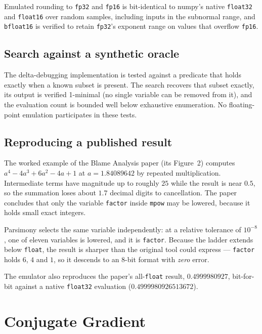 \documentclass[11pt]{article}
\begin{document}
Emulated rounding to \texttt{fp32} and \texttt{fp16} is bit-identical to numpy's
native \texttt{float32} and \texttt{float16} over random samples, including
inputs in the subnormal range, and \texttt{bfloat16} is verified to retain
\texttt{fp32}'s exponent range on values that overflow \texttt{fp16}.

\subsection{Search against a synthetic oracle}

The delta-debugging implementation is tested against a predicate that holds
exactly when a known subset is present. The search recovers that subset exactly,
its output is verified 1-minimal (no single variable can be removed from it),
and the evaluation count is bounded well below
exhaustive enumeration. No floating-point emulation participates in these tests.

\subsection{Reproducing a published result}
\label{sec:repro}

The worked example of the Blame Analysis paper (its Figure~2) computes
$a^4 - 4a^3 + 6a^2 - 4a + 1$ at $a = 1.84089642$ by repeated multiplication.
Intermediate terms have magnitude up to roughly $25$ while the result is near
$0.5$, so the
summation loses about $1.7$ decimal digits to cancellation. The paper concludes
that only the variable \texttt{factor} inside \texttt{mpow} may be lowered,
because it holds small exact integers.

Parsimony selects the same variable independently: at a relative tolerance of
$10^{-8}$, one of eleven variables is lowered, and it is \texttt{factor}. Because
the ladder extends below \texttt{float}, the result is sharper than the original
tool could express --- \texttt{factor} holds $6$, $4$ and $1$, so it descends to an
8-bit format with \emph{zero} error.

The emulator also reproduces the paper's all-\texttt{float} result, $0.4999980927$,
bit-for-bit against a native \texttt{float32} evaluation
($0.4999980926513672$).

\section{Conjugate Gradient}
\label{sec:nascg}
\end{document}
